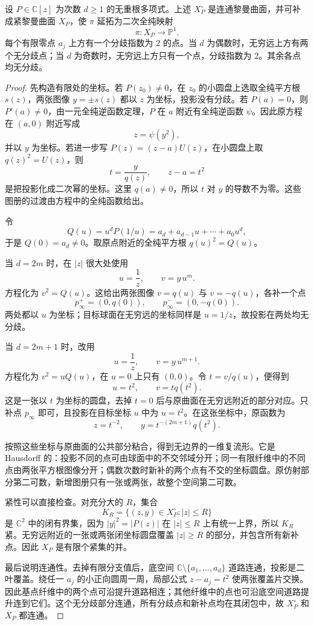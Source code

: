 \begin{proposition}\label{g4:prop:0204:hyperelliptic-completion}
	设 \(P\in\mathbb C[z]\) 为次数 \(d\ge1\) 的无重根多项式。上述 \(X_P^\circ\) 是连通黎曼曲面，并可补成紧黎曼曲面 \(X_P\)，使 \(\pi\) 延拓为二次全纯映射
	\[
		\pi:X_P\longrightarrow\mathbb P^1.
	\]
	每个有限零点 \(a_j\) 上方有一个分歧指数为 \(2\) 的点。当 \(d\) 为偶数时，无穷远上方有两个无分歧点；当 \(d\) 为奇数时，无穷远上方只有一个点，分歧指数为 \(2\)。其余各点均无分歧。
\end{proposition}
\begin{proof}
	先构造有限处的坐标。若 \(P(z_0)\ne0\)，在 \(z_0\) 的小圆盘上选取全纯平方根 \(s(z)\)，两张图像 \(y=\pm s(z)\) 都以 \(z\) 为坐标，投影没有分歧。若 \(P(a)=0\)，则 \(P'(a)\ne0\)，由一元全纯逆函数定理，\(P\) 在 \(a\) 附近有全纯逆函数 \(\psi\)。因此原方程在 \((a,0)\) 附近写成
	\[
		z=\psi(y^2),
	\]
	并以 \(y\) 为坐标。若进一步写 \(P(z)=(z-a)U(z)\)，在小圆盘上取 \(q(z)^2=U(z)\)，则
	\[
		t=\frac{y}{q(z)},\qquad z-a=t^2
	\]
	是把投影化成二次幂的坐标。这里 \(q(a)\ne0\)，所以 \(t\) 对 \(y\) 的导数不为零。这些图册的过渡由方程中的全纯函数给出。

	令
	\[
		Q(u)=u^dP(1/u)=a_d+a_{d-1}u+\cdots+a_0u^d,
	\]
	于是 \(Q(0)=a_d\ne0\)。取原点附近的全纯平方根 \(q(u)^2=Q(u)\)。

	当 \(d=2m\) 时，在 \(|z|\) 很大处使用
	\[
		u=\frac1z,\qquad v=y\,u^m.
	\]
	方程化为 \(v^2=Q(u)\)。这给出两张图像 \(v=q(u)\) 与 \(v=-q(u)\)，各补一个点
	\[
		p_\infty^+=(0,q(0)),\qquad p_\infty^-=(0,-q(0)).
	\]
	两处都以 \(u\) 为坐标；目标球面在无穷远的坐标同样是 \(u=1/z\)，故投影在两处均无分歧。

	当 \(d=2m+1\) 时，改用
	\[
		u=\frac1z,\qquad v=y\,u^{m+1}.
	\]
	方程化为 \(v^2=uQ(u)\)，在 \(u=0\) 上只有 \((0,0)\)。令 \(t=v/q(u)\)，便得到
	\[
		u=t^2,\qquad v=tq(t^2).
	\]
	这是一张以 \(t\) 为坐标的圆盘，去掉 \(t=0\) 后与原曲面在无穷远附近的部分对应。只补点 \(p_\infty\) 即可，且投影在目标坐标 \(u\) 中为 \(u=t^2\)。在这张坐标中，原函数为
	\begin{equation}\label{g4:eq:0204:odd-infinity}
		z=t^{-2},\qquad y=t^{-(2m+1)}q(t^2).
	\end{equation}

	按照这些坐标与原曲面的公共部分粘合，得到无边界的一维复流形。它是 Hausdorff 的：投影不同的点可由球面中的不交邻域分开；同一有限纤维中的不同点由两张平方根图像分开；偶数次数时新补的两个点有不交的坐标圆盘。原仿射部分第二可数，新增图册只有一张或两张，故整个空间第二可数。

	紧性可以直接检查。对充分大的 \(R\)，集合
	\[
		K_R=\{(z,y)\in X_P^\circ:|z|\le R\}
	\]
	是 \(\mathbb C^2\) 中的闭有界集，因为 \(|y|^2=|P(z)|\) 在 \(|z|\le R\) 上有统一上界，所以 \(K_R\) 紧。无穷远附近的一张或两张闭坐标圆盘覆盖 \(|z|\ge R\) 的部分，并包含所有新补点。因此 \(X_P\) 是有限个紧集的并。

	最后说明连通性。去掉有限分支值后，底空间 \(\mathbb C\setminus\{a_1,\ldots,a_d\}\) 道路连通，投影是二叶覆盖。绕任一 \(a_j\) 的小正向圆周一周，局部公式 \(z-a_j=t^2\) 使两张覆盖片交换。因此基点纤维中的两个点可沿提升道路相连；其他纤维中的点也可沿底空间道路提升连到它们。这个无分歧部分连通，所有分歧点和新补点均在其闭包中，故 \(X_P^\circ\) 和 \(X_P\) 都连通。
\end{proof}

